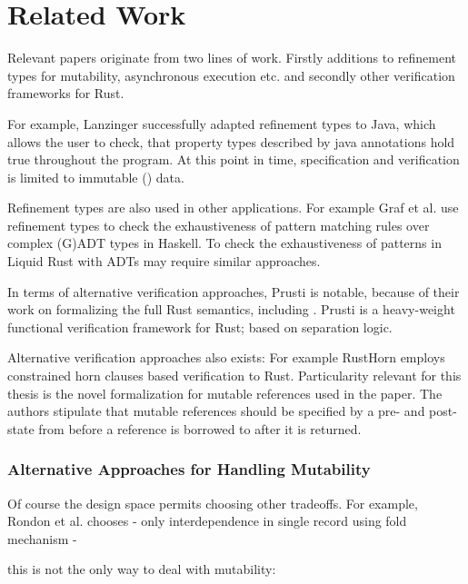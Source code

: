\documentclass[twoside, english]{sdqthesis}
\theoremstyle{definition}
\begin{document}
\chapter{Related Work} \label{ch:related-work}

Relevant papers originate from two lines of work. Firstly additions to refinement types for mutability, asynchronous execution etc. and secondly other verification frameworks for Rust.

For example, Lanzinger \cite{lanzinger_property_2021} successfully adapted refinement types to Java, which allows the user to check, that property types described by java annotations hold true throughout the program. At this point in time, specification and verification is limited to immutable () data.



Refinement types are also used in other applications. For example Graf et al. \cite{graf_lower_2020} use refinement types to check the exhaustiveness of pattern matching rules over complex (G)ADT types in Haskell. To check the exhaustiveness of patterns in Liquid Rust with ADTs may require similar approaches.

In terms of alternative verification approaches, Prusti\cite{astrauskas_leveraging_2019} is notable, because of their work on formalizing the full Rust semantics, including . Prusti is a heavy-weight functional verification framework for Rust; based on separation logic.

Alternative verification approaches also exists: For example RustHorn\cite{matsushita_rusthorn_2020} employs constrained horn clauses based verification to Rust. Particularity relevant for this thesis is the novel formalization for mutable references used in the paper. The authors stipulate that mutable references should be specified by a pre- and post-state from before a reference is borrowed to after it is returned.


\subsection{Alternative Approaches for Handling Mutability} \label{subsec:related-work-mutability} 

Of course the design space permits choosing other tradeoffs. For example, Rondon et al. \cite{rondon_low-level_2010} chooses 
  - only interdependence in single record using fold mechanism
  - 

this is not the only way to deal with mutability: 
\end{document}
